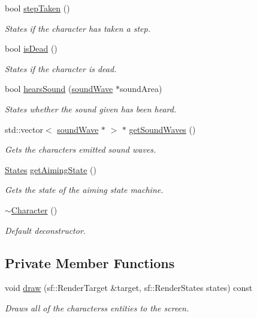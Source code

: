\begin{DoxyCompactItemize}
bool \hyperlink{class_character_a1e7a69d8500b81ad27e51923ec1b335b}{step\+Taken} ()
\begin{DoxyCompactList}\small\item\em States if the character has taken a step. \end{DoxyCompactList}\item 
bool \hyperlink{class_character_a16c884ce2071ab8f4a715de559b2f2fc}{is\+Dead} ()
\begin{DoxyCompactList}\small\item\em States if the character is dead. \end{DoxyCompactList}\item 
bool \hyperlink{class_character_a3bf37110e85ed79119ddb103fab670e4}{hears\+Sound} (\hyperlink{classsound_wave}{sound\+Wave} $\ast$sound\+Area)
\begin{DoxyCompactList}\small\item\em States whether the sound given has been heard. \end{DoxyCompactList}\item 
std\+::vector$<$ \hyperlink{classsound_wave}{sound\+Wave} $\ast$ $>$ $\ast$ \hyperlink{class_character_a66131b3b77693e6ceea53b498f90f949}{get\+Sound\+Waves} ()
\begin{DoxyCompactList}\small\item\em Gets the characters emitted sound waves. \end{DoxyCompactList}\item 
\hyperlink{_character_8h_a808e5cd4979462d3bbe3070d7d147444}{States} \hyperlink{class_character_aaa04388699d1b6cb0a48e1daed8eb63a}{get\+Aiming\+State} ()
\begin{DoxyCompactList}\small\item\em Gets the state of the aiming state machine. \end{DoxyCompactList}\item 
\hyperlink{class_character_a9e9be564d05ded80962b2045aa70b3fc}{$\sim$\+Character} ()
\begin{DoxyCompactList}\small\item\em Default deconstructor. \end{DoxyCompactList}\end{DoxyCompactItemize}
\subsection*{Private Member Functions}
\begin{DoxyCompactItemize}
\item 
void \hyperlink{class_character_a3812c72bf1cf8090f67a3387b5d96753}{draw} (sf\+::\+Render\+Target \&target, sf\+::\+Render\+States states) const
\begin{DoxyCompactList}\small\item\em Draws all of the characters\textquotesingle{}s entities to the screen. \end{DoxyCompactList}\end{DoxyCompactItemize}
